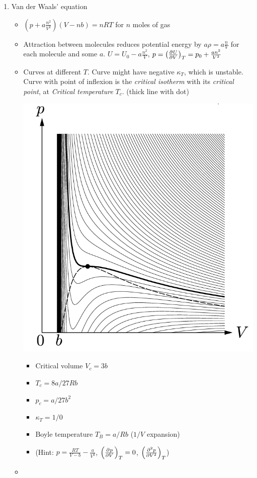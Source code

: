 \documentclass{article}
\theoremstyle{remark}
\newcommand{\ppdv}[4][]{\left(\pdv[#1]{#2}{#3}\right)_{#4}}
\begin{document}
\begin{enumerate}
    \item Van der Waals' equation\begin{itemize}
            \item $\left(p+a\frac{n^2}{V^2}\right)(V-nb)=nRT$ for $n$ moles of gas
            \item Attraction between molecules reduces potential energy by $a\rho=a\frac{n}{V}$ for each molecule and some $a$.
                $U=U_0-a\frac{n^2}{V}$, $p=\ppdv{U}{V}{T}=p_0+\frac{an^2}{V^2}$
            \item Curves at different $T$. Curve might have negative $\kappa_T$, which is unstable.
                Curve with point of inflexion is the \emph{critical isotherm} with its \emph{critical point}, at \emph{Critical temperature} $T_c$. (thick line with dot)
                \begin{center}
                    \includegraphics*[width=0.5\linewidth]{van_der_waal.png}
                \end{center}
                \begin{itemize}
                    \item Critical volume $V_c=3b$
                    \item $T_c=8a/27Rb$
                    \item $p_c=a/27b^2$
                    \item $\kappa_T=1/0$
                    \item Boyle temperature $T_B=a/Rb$ ($1/V$ expansion)
                    \item (Hint: $p=\frac{RT}{V-b}-\frac{a}{V^2}$, $\ppdv{p}{V}{T}=0$, $\ppdv[2]{p}{V}{T}$)
                \end{itemize}
            \item \begin{minipage}{0.4\linewidth}

\end{minipage}
\end{itemize}
\end{enumerate}
\end{document}
